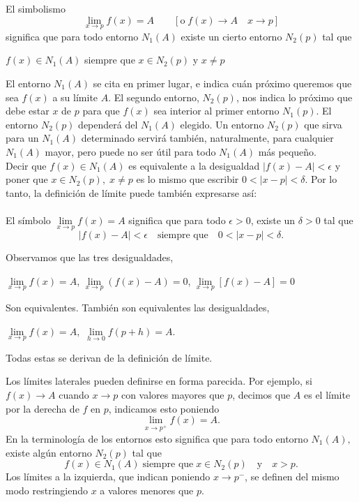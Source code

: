 \begin{tcolorbox}
    \begin{def.}
	El simbolismo $$\lim_{x\to p}f(x)=A\qquad [\mbox{o}\; {f(x)\to A}\quad {x\to p}]$$
	significa que para todo entorno $N_1(A)$ existe un cierto entorno $N_2(p)$ tal que 
	\begin{center}
	    $f(x)\in N_1(A)$ siempre que $x\in N_2(p)$ y $x\neq p$
	\end{center}
	\vspace{0.3cm}
	El entorno $N_1(A)$ se cita en primer lugar, e indica cuán próximo queremos que sea $f(x)$ a su límite $A$. El segundo entorno, $N_2(p)$, nos indica lo próximo que debe estar $x$ de $p$ para que $f(x)$ sea interior al primer entorno $N_1(p)$. El entorno $N_2(p)$ dependerá del $N_1(A)$ elegido. Un entorno $N_2(p)$ que sirva para un $N_1(A)$ determinado servirá también, naturalmente, para cualquier $N_1(A)$ mayor, pero puede no ser útil para todo $N_1(A)$ más pequeño.\\
	Decir que $f(x)\in N_1(A)$ es equivalente a la desigualdad $|f(x)-A|<\epsilon$ y poner que $x\in N_2(p),\; x\neq p$ es lo mismo que escribir $0<|x-p|<\delta$. Por lo tanto, la definición de límite puede también expresarse así:\\\\
	El símbolo $\lim\limits_{x\to p}f(x)=A$ significa que para todo $\epsilon > 0$, existe un $\delta >0$ tal que $$|f(x)-A|<\epsilon \quad \mbox{siempre que}\quad 0<|x-p|<\delta.$$
    \end{def.}
\end{tcolorbox}

Observamos que las tres desigualdades,

\begin{center}
    $\lim\limits_{x\to p}f(x)=A$, $\lim\limits_{x\to p}(f(x)-A)=0$, $\lim\limits_{x\to p}[f(x)-A]=0$
\end{center}

Son equivalentes. También son equivalentes las desigualdades,
    
\begin{center}
    $\lim\limits_{x\to p} f(x)=A,$ $\lim\limits_{h\to 0}f(p+h)=A.$
\end{center}

Todas estas se derivan de la definición de límite.\\
\begin{tcolorbox}
    \begin{def.}
	Los límites laterales pueden definirse en forma parecida. Por ejemplo, si ${f(x)\to A}$ cuando ${x\to p}$ con valores mayores que $p$, decimos que $A$ es el límite por la derecha de $f$ en $p$, indicamos esto poniendo
	$$\lim_{x\to p^+}f(x)=A.$$
	En la terminología de los entornos esto significa que para todo entorno $N_1(A),$ existe algún entorno $N_2(p)$ tal que 
	$$f(x)\in N_1(A)\; \mbox{siempre que}\; x \in N_2(p)\quad \mbox{y}\quad x>p.$$
	Los límites a la izquierda, que indican poniendo ${x\to p^-}$, se definen del mismo modo restringiendo $x$ a valores menores que $p$.
    \end{def.}
\end{tcolorbox}


